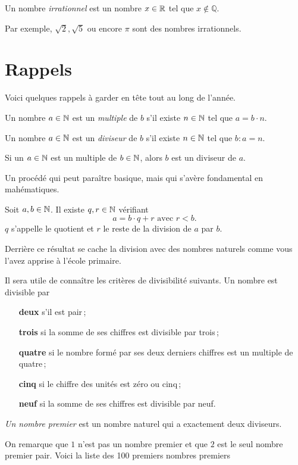 \documentclass[a4paper,12pt]{report}
\begin{document}
\begin{defi}
Un nombre \emph{irrationnel} est un nombre $x\in \mathbb R$ tel que $x\not \in \mathbb Q$.
\end{defi}
 Par exemple, $\sqrt{2}, \sqrt{5}$ ou encore $\pi$ sont des nombres irrationnels.

\section{Rappels}
Voici quelques rappels à garder en tête tout au long de l'année. 

\begin{defi}[multiple]
	Un nombre $a\in \mathbb N$ est un \emph{multiple} de $b$ s'il existe $n\in \mathbb N$ tel que $a=b\cdot n$. 	
\end{defi}

\begin{defi}[diviseur]
	Un nombre $a\in \mathbb N$ est un \emph{diviseur} de $b$ s'il existe $n\in \mathbb N$ tel que $b: a=n$. 
\end{defi}
Si un $a\in \mathbb N$ est un multiple de $b\in \mathbb N$, alors $b$ est un diviseur de $a$.

Un procédé qui peut paraître basique, mais qui s'avère fondamental en mahématiques.

\begin{resultat}
	Soit $a, b\in \mathbb N$. Il existe $q,r\in \mathbb N$ vérifiant
	\[a=b\cdot q + r \text{ avec } r<b.\]
	$q$ s'appelle le quotient et $r$ le reste de la division de $a$ par $b$.
\end{resultat}
Derrière ce résultat se cache la division avec des nombres naturels comme vous l'avez apprise à l'école primaire.

Il sera utile de connaître les critères de divisibilité suivants.
Un nombre est divisible par
\begin{enumerate}[leftmargin=2cm]
	\item[{\bfseries deux}] s'il est pair\,;
	\item[{\bfseries trois}] si la somme de ses chiffres est divisible par trois\,;
	\item[{\bfseries quatre}] si le nombre formé par ses deux derniers chiffres est un multiple de quatre\,;
	\item[{\bfseries cinq}] si le chiffre des unités est zéro ou cinq\,;
	\item[{\bfseries neuf}] si la somme de ses chiffres est divisible par neuf.
\end{enumerate}
\begin{defi}
	\emph{Un nombre premier} est un nombre naturel qui a exactement deux diviseurs.
\end{defi}
On remarque que $1$ n'est pas un nombre premier et que $2$ est le seul nombre premier pair.
Voici la liste des 100 premiers nombres premiers
\end{document}
